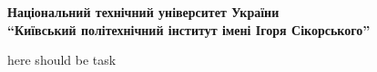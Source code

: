 \thispagestyle{empty}

\begin{center}
\textbf{Національний технічний  університет України \\
``Київський політехнічний інститут імені Ігоря Сікорського''}
\end{center}

here should be task